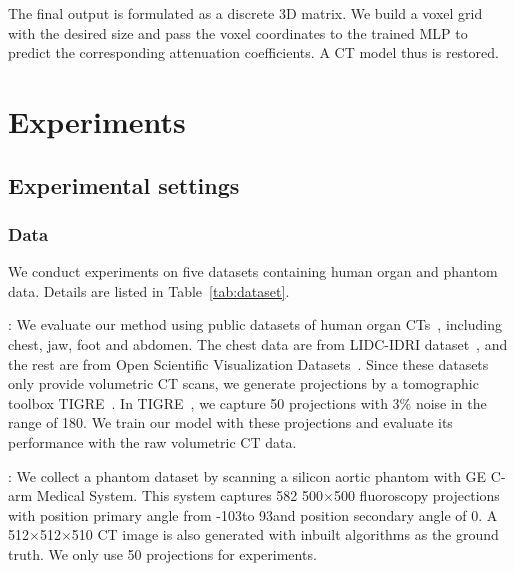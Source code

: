 \documentclass[runningheads]{llncs}
\begin{document}
The final output is formulated as a discrete 3D matrix. We build a voxel grid with the desired size and pass the voxel coordinates to the trained MLP to predict the corresponding attenuation coefficients. A CT model thus is restored.



\section{Experiments}
\subsection{Experimental settings}

\subsubsection{Data}
We conduct experiments on five datasets containing human organ and phantom data. Details are listed in Table~\ref{tab:dataset}. 

: We evaluate our method using public datasets of human organ CTs~\cite{armato2011lung,Klacansky2022Open}, including chest, jaw, foot and abdomen. The chest data are from LIDC-IDRI dataset~\cite{armato2011lung}, and the rest are from Open Scientific Visualization Datasets~\cite{Klacansky2022Open}. Since these datasets only provide volumetric CT scans, we generate projections by a tomographic toolbox TIGRE~\cite{biguri2016tigre}. In TIGRE~\cite{biguri2016tigre}, we capture 50 projections with 3\% noise in the range of 180\degree. We train our model with these projections and evaluate its performance with the raw volumetric CT data.

: We collect a phantom dataset by scanning a silicon aortic phantom with GE C-arm Medical System. This system captures 582 500$\times$500 fluoroscopy projections with position primary angle from -103\degree to 93\degree and position secondary angle of 0\degree. A 512$\times$512$\times$510 CT image is also generated with inbuilt algorithms as the ground truth. We only use 50 projections for experiments.
\end{document}
